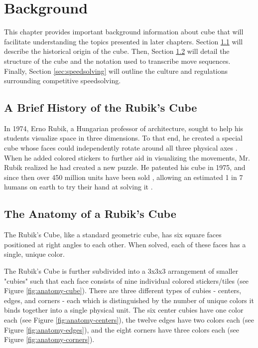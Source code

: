 %

\chapter{Background}
\label{Chapter2}

This chapter provides important background information about cube that
will facilitate understanding the topics presented in later chapters.
Section \ref{sec:rubiks-history} will describe the historical origin of
the cube. Then, Section \ref{sec:rubiks-anatomy} will detail the
structure of the cube and the notation used to transcribe move
sequences. Finally, Section \ref{sec:speedsolving} will outline the
culture and regulations surrounding competitive speedsolving.


\section{A Brief History of the Rubik's Cube}
\label{sec:rubiks-history}

In 1974, Erno Rubik, a Hungarian professor of architecture, sought to
help his students visualize space in three dimensions. To that end, he
created a special cube whose faces could independently rotate around
all three physical axes \cite{rubik-motivation}. When he added colored
stickers to further aid in visualizing the movements, Mr. Rubik
realized he had created a new puzzle. He patented his cube in 1975,
\cite{rubik-patent} and since then over 450 million units have been
sold \cite{forbes-rubik-merger}, allowing an estimated 1 in 7 humans on
earth to try their hand at solving it \cite{rubik-population-reached}.


\section{The Anatomy of a Rubik's Cube}
\label{sec:rubiks-anatomy}

The Rubik's Cube, like a standard geometric cube, has six square faces
positioned at right angles to each other. When solved, each of these
faces has a single, unique color.

The Rubik's Cube is further subdivided into a 3x3x3 arrangement of
smaller "cubies" such that each face consists of nine individual
colored stickers/tiles (see Figure \ref{fig:anatomy-cube}). There are
three different types of cubies - centers, edges, and corners - each
which is distinguished by the number of unique colors it binds together
into a single physical unit. The six center cubies have one color each
(see Figure \ref{fig:anatomy-centers}), the twelve edges have two
colors each (see Figure \ref{fig:anatomy-edges}), and the eight corners
have three colors each (see Figure \ref{fig:anatomy-corners}).


